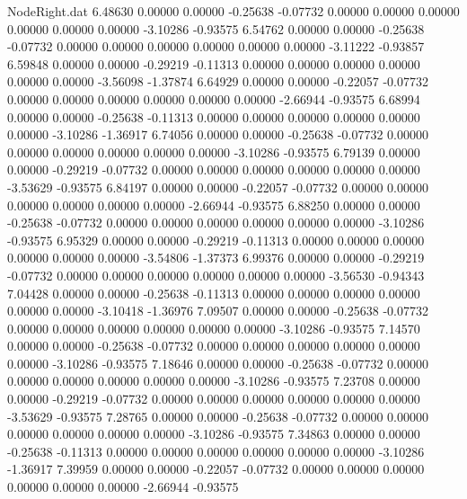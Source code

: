\begin{filecontents}{NodeRight.dat}
   6.48630    0.00000    0.00000    -0.25638   -0.07732    0.00000    0.00000    0.00000    0.00000    0.00000    0.00000   -3.10286   -0.93575
   6.54762    0.00000    0.00000    -0.25638   -0.07732    0.00000    0.00000    0.00000    0.00000    0.00000    0.00000   -3.11222   -0.93857
   6.59848    0.00000    0.00000    -0.29219   -0.11313    0.00000    0.00000    0.00000    0.00000    0.00000    0.00000   -3.56098   -1.37874
   6.64929    0.00000    0.00000    -0.22057   -0.07732    0.00000    0.00000    0.00000    0.00000    0.00000    0.00000   -2.66944   -0.93575
   6.68994    0.00000    0.00000    -0.25638   -0.11313    0.00000    0.00000    0.00000    0.00000    0.00000    0.00000   -3.10286   -1.36917
   6.74056    0.00000    0.00000    -0.25638   -0.07732    0.00000    0.00000    0.00000    0.00000    0.00000    0.00000   -3.10286   -0.93575
   6.79139    0.00000    0.00000    -0.29219   -0.07732    0.00000    0.00000    0.00000    0.00000    0.00000    0.00000   -3.53629   -0.93575
   6.84197    0.00000    0.00000    -0.22057   -0.07732    0.00000    0.00000    0.00000    0.00000    0.00000    0.00000   -2.66944   -0.93575
   6.88250    0.00000    0.00000    -0.25638   -0.07732    0.00000    0.00000    0.00000    0.00000    0.00000    0.00000   -3.10286   -0.93575
   6.95329    0.00000    0.00000    -0.29219   -0.11313    0.00000    0.00000    0.00000    0.00000    0.00000    0.00000   -3.54806   -1.37373
   6.99376    0.00000    0.00000    -0.29219   -0.07732    0.00000    0.00000    0.00000    0.00000    0.00000    0.00000   -3.56530   -0.94343
   7.04428    0.00000    0.00000    -0.25638   -0.11313    0.00000    0.00000    0.00000    0.00000    0.00000    0.00000   -3.10418   -1.36976
   7.09507    0.00000    0.00000    -0.25638   -0.07732    0.00000    0.00000    0.00000    0.00000    0.00000    0.00000   -3.10286   -0.93575
   7.14570    0.00000    0.00000    -0.25638   -0.07732    0.00000    0.00000    0.00000    0.00000    0.00000    0.00000   -3.10286   -0.93575
   7.18646    0.00000    0.00000    -0.25638   -0.07732    0.00000    0.00000    0.00000    0.00000    0.00000    0.00000   -3.10286   -0.93575
   7.23708    0.00000    0.00000    -0.29219   -0.07732    0.00000    0.00000    0.00000    0.00000    0.00000    0.00000   -3.53629   -0.93575
   7.28765    0.00000    0.00000    -0.25638   -0.07732    0.00000    0.00000    0.00000    0.00000    0.00000    0.00000   -3.10286   -0.93575
   7.34863    0.00000    0.00000    -0.25638   -0.11313    0.00000    0.00000    0.00000    0.00000    0.00000    0.00000   -3.10286   -1.36917
   7.39959    0.00000    0.00000    -0.22057   -0.07732    0.00000    0.00000    0.00000    0.00000    0.00000    0.00000   -2.66944   -0.93575

\end{filecontents}
